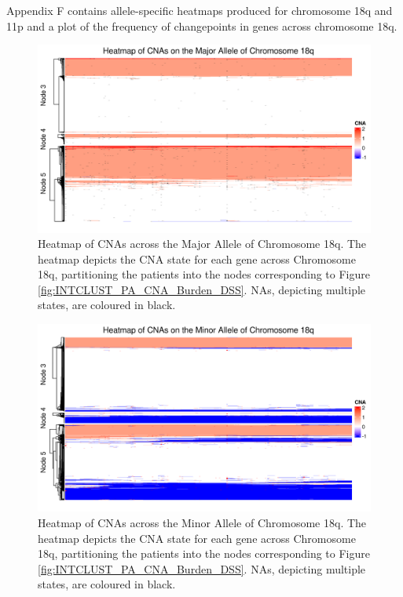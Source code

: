 {}


Appendix F contains allele-specific heatmaps produced for chromosome 18q and 11p and a plot of the frequency of changepoints in genes across chromosome 18q.

\vfill
\begin{figure}[!htb]
\centering
\includegraphics[width = 1\textwidth]{../figures/Chapter_6/Heatmap_Chr18q_Genes_Major.png}
\caption[Heatmap of CNAs across the Major Allele of Chromosome 18q]{Heatmap of CNAs across the Major Allele of Chromosome 18q. The heatmap depicts the CNA state for each gene across Chromosome 18q, partitioning the patients into the nodes corresponding to Figure \ref{fig:INTCLUST_PA_CNA_Burden_DSS}. NAs, depicting multiple states, are coloured in black.}
\label{fig:heatmap_Major_18q}
\end{figure}
\vfill 

\begin{figure}[!htb]
\centering
\includegraphics[width = 1\textwidth]{../figures/Chapter_6/Heatmap_Chr18q_Genes_Minor.png}
\caption[Heatmap of CNAs across the Minor Allele of Chromosome 18q]{Heatmap of CNAs across the Minor Allele of Chromosome 18q. The heatmap depicts the CNA state for each gene across Chromosome 18q, partitioning the patients into the nodes corresponding to Figure \ref{fig:INTCLUST_PA_CNA_Burden_DSS}. NAs, depicting multiple states, are coloured in black.}
\label{fig:heatmap_Minor_18q}
\end{figure}

